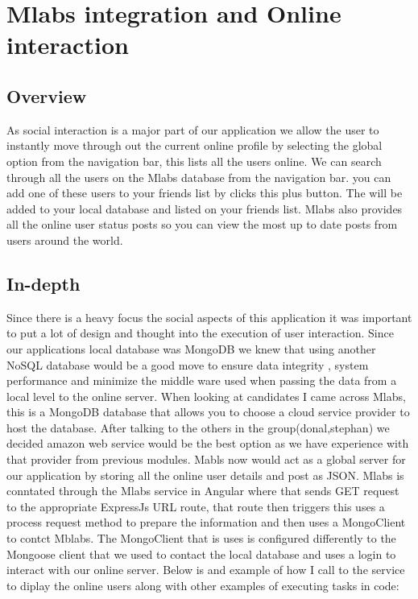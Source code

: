 \section{Mlabs integration and Online interaction}

\subsection{Overview}
As social interaction is a major part of our application we allow the user to instantly move through out the current online profile by selecting the global option from the navigation bar, this lists all the users online. We can search through all the users on the Mlabs database from the navigation bar. you can add one of these users to your friends list by clicks this plus button. The will be added to your local database and listed on your friends list. Mlabs also provides all the online user status posts so you can view the most up to date posts from users around the world.

\subsection{In-depth}
Since there is a heavy focus the social aspects of this application it was important to put a lot of design and thought into the execution of user interaction. Since our applications local database was MongoDB we knew that using another NoSQL database would be a good move to ensure data integrity , system performance and minimize the middle ware used when passing the data from a local level to the online server. When looking at candidates I came across Mlabs, this is a MongoDB database that allows you to choose a cloud service provider to host the database. After talking to the others in the group(donal,stephan) we decided amazon web service would be the best option as we have experience with that provider from previous modules. Mabls now would act as a global server for our application by storing all the online user details and post as JSON. Mlabs is conntated through the Mlabs service in Angular where that sends GET request to the appropriate ExpressJs URL route, that route then triggers this uses a process request method to prepare the information and then uses a MongoClient to contct Mblabs. The MongoClient that is uses is configured differently to the Mongoose client that we used to contact the local database and uses a login to interact with our online server. Below is and example of how I call to the service to diplay the online users along with other examples of executing tasks in code:
    
